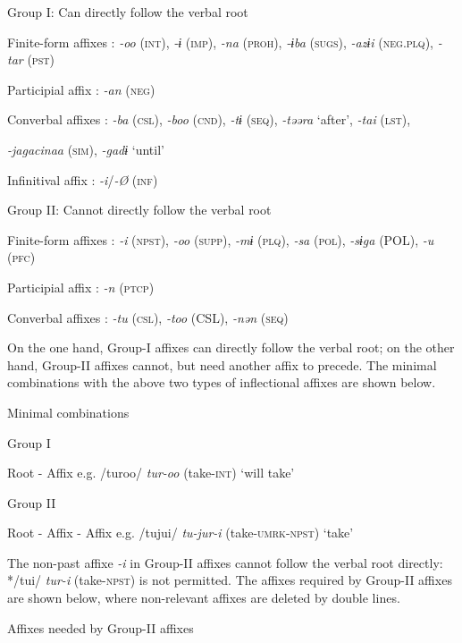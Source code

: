 \ea Group I: Can directly follow the verbal root

    Finite-form affixes  : \textit{{}-oo} (\textsc{int}), \textit{{}-ɨ} (\textsc{imp}), \textit{{}-na} (\textsc{proh}), \textit{{}-ɨba} (\textsc{sugs}), \textit{{}-azɨi} (\textsc{neg}.\textsc{plq}), \textit{{}-tar} (\textsc{pst})

    Participial affix  : \textit{{}-an} (\textsc{neg})

    Converbal affixes  : \textit{{}-ba} (\textsc{csl}), \textit{{}-boo} (\textsc{cnd}), \textit{{}-tɨ} (\textsc{seq}), \textit{{}-təəra} ‘after’, \textit{{}-tai} (\textsc{lst}),

\textit{{}-jagacinaa} (\textsc{sim}), \textit{{}-gadɨ} ‘until’

    Infinitival affix  : \textit{{}-i}/\textit{{}-Ø} (\textsc{inf})

\ex Group II: Cannot directly follow the verbal root

    Finite-form affixes  : \textit{{}-i} (\textsc{npst}), \textit{{}-oo} (\textsc{supp}), \textit{{}-mɨ} (\textsc{plq}), \textit{{}-sa} (\textsc{pol}), \textit{{}-sɨga} (POL), \textit{{}-u} (\textsc{pfc})

    Participial affix  : \textit{{}-n} (\textsc{ptcp})

    Converbal affixes  : \textit{{}-tu} (\textsc{csl}), \textit{{}-too} (CSL), \textit{{}-nən} (\textsc{seq})

On the one hand, Group-I affixes can directly follow the verbal root; on the other hand, Group-II affixes cannot, but need another affix to precede. The minimal combinations with the above two types of inflectional affixes are shown below.

\ea\label{ex:8-4}
  Minimal combinations

\ea Group I

    Root  {}-  Affix        e.g.  /turoo/  \textit{tur-oo}  (take-\textsc{int})  ‘will take’

\ex Group II

    Root  {}-  Affix  {}-  Affix    e.g.  /tujui/  \textit{tu-jur-i}  (take-\textsc{umrk}-\textsc{npst})  ‘take’

The non-past affixe \textit{{}-i} in Group-II affixes cannot follow the verbal root directly: */tui/ \textit{tur-i} (take-\textsc{npst}) is not permitted. The affixes required by Group-II affixes are shown below, where non-relevant affixes are deleted by double lines.

\ea\label{ex:8-5}
  Affixes needed by Group-II affixes

